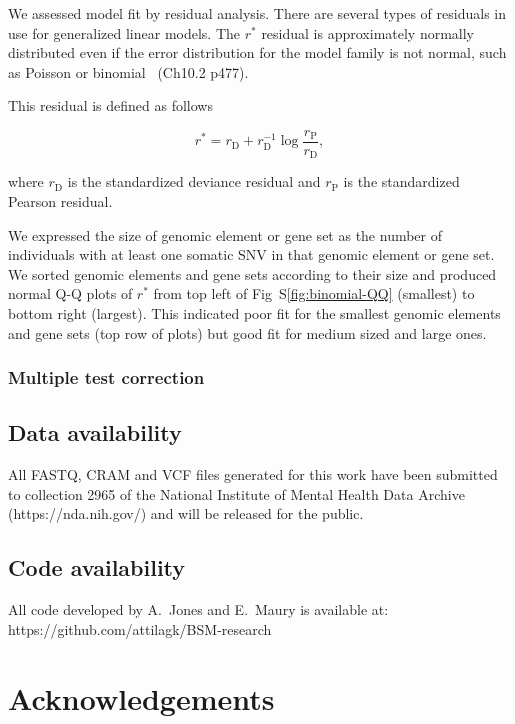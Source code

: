 \documentclass[letterpaper]{article}
\begin{document}
We assessed model fit by residual analysis.  There are several types of residuals in use for generalized linear models.
The $r^\ast$ residual is approximately normally distributed even if the error
distribution for the model family is not normal, such as Poisson or
binomial~\citep{davison2003statistical} (Ch10.2 p477).

This residual is defined as follows

$$
r^\ast = r_\mathrm{D} + r_\mathrm{D}^{-1} \log
\frac{r_\mathrm{P}}{r_\mathrm{D}},
$$

where \(r_\mathrm{D}\) is the standardized deviance residual and
\(r_\mathrm{P}\) is the standardized Pearson residual.

We expressed the size of genomic element or gene set as the number of
individuals with at least one somatic SNV in that genomic element or gene set.
We sorted genomic elements and gene sets according to their size and produced
normal Q-Q plots of \(r^\ast\) from top left of Fig~S\ref{fig:binomial-QQ} (smallest) to
bottom right (largest).  This indicated poor fit for the smallest genomic
elements and gene sets (top row of plots) but good fit for medium sized and
large ones.

\subsubsection*{Multiple test correction}

\subsection*{Data availability}

All FASTQ, CRAM and VCF files generated for this work have been submitted to
collection 2965 of the National Institute of Mental Health Data Archive
(https://nda.nih.gov/) and will be released for the public.

\subsection*{Code availability}

All code developed by A.~Jones and E.~Maury is available at:\\
https://github.com/attilagk/BSM-research




\section*{Acknowledgements}
\end{document}
